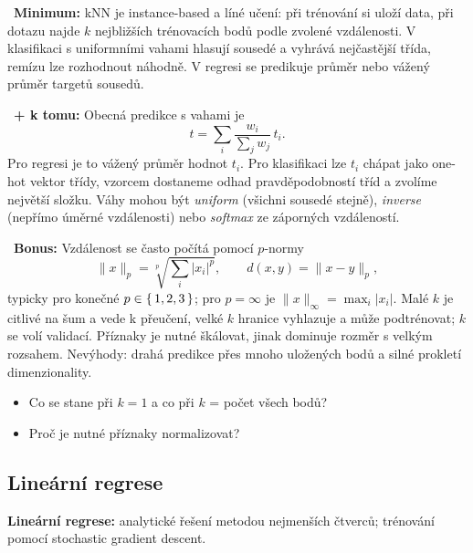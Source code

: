 \begin{odpoved}
\setlength{\parskip}{2pt}
\noindent{}\ \textbf{Minimum:} kNN je instance-based a líné učení: při trénování si uloží data, při dotazu najde $k$ nejbližších trénovacích bodů podle zvolené vzdálenosti. V klasifikaci s uniformními vahami hlasují sousedé a vyhrává nejčastější třída, remízu lze rozhodnout náhodně. V regresi se predikuje průměr nebo vážený průměr targetů sousedů.\par
\noindent{}\ \textbf{+ k tomu:} Obecná predikce s vahami je
\[
t=\sum_i \frac{w_i}{\sum_j w_j}\,t_i.
\]
Pro regresi je to vážený průměr hodnot $t_i$. Pro klasifikaci lze $t_i$ chápat jako one-hot vektor třídy, vzorcem dostaneme odhad pravděpodobností tříd a zvolíme největší složku. Váhy mohou být \emph{uniform} (všichni sousedé stejně), \emph{inverse} (nepřímo úměrné vzdálenosti) nebo \emph{softmax} ze záporných vzdáleností.\par
\noindent{}\ \textbf{Bonus:} Vzdálenost se často počítá pomocí $p$-normy
\[
\|x\|_p=\sqrt[p]{\sum_i |x_i|^p},\qquad d(x,y)=\|x-y\|_p,
\]
typicky pro konečné $p\in\{\,1,2,3\,\}$; pro $p=\infty$ je $\|x\|_\infty=\max_i |x_i|$. Malé $k$ je citlivé na šum a vede k přeučení, velké $k$ hranice vyhlazuje a může podtrénovat; $k$ se volí validací. Příznaky je nutné škálovat, jinak dominuje rozměr s velkým rozsahem. Nevýhody: drahá predikce přes mnoho uložených bodů a silné prokletí dimenzionality.
\end{odpoved}
\begin{recall}
\begin{itemize}[leftmargin=1.2em,itemsep=0pt,topsep=1pt]
  \item Co se stane při $k=1$ a co při $k$ = počet všech bodů?
  \item Proč je nutné příznaky normalizovat?
\end{itemize}
\end{recall}

\subsection{Lineární regrese}

\begin{tema}
\textbf{Lineární regrese:} analytické řešení metodou nejmenších čtverců; trénování pomocí
stochastic gradient descent.
\end{tema}
\begin{vezkratce}
\end{vezkratce}

